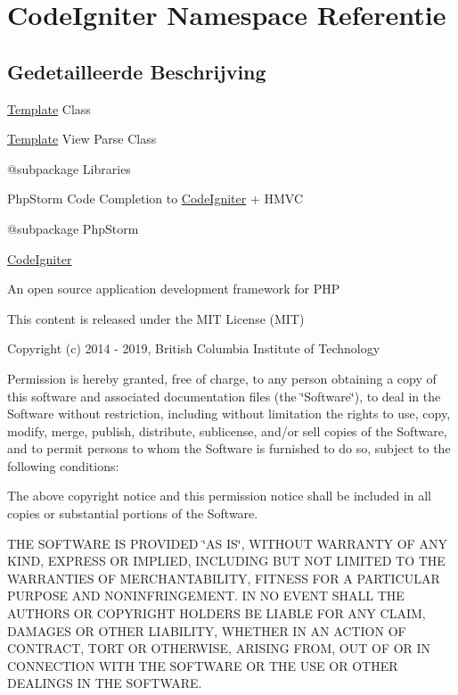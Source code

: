 \hypertarget{namespace_code_igniter}{}\section{Code\+Igniter Namespace Referentie}
\label{namespace_code_igniter}


\subsection{Gedetailleerde Beschrijving}
\mbox{\hyperlink{class_template}{Template}} Class

\mbox{\hyperlink{class_template}{Template}} View Parse Class

@subpackage Libraries

Php\+Storm Code Completion to \mbox{\hyperlink{namespace_code_igniter}{Code\+Igniter}} + H\+M\+VC

@subpackage Php\+Storm

\mbox{\hyperlink{namespace_code_igniter}{Code\+Igniter}}

An open source application development framework for P\+HP

This content is released under the M\+IT License (M\+IT)

Copyright (c) 2014 -\/ 2019, British Columbia Institute of Technology

Permission is hereby granted, free of charge, to any person obtaining a copy of this software and associated documentation files (the \char`\"{}\+Software\char`\"{}), to deal in the Software without restriction, including without limitation the rights to use, copy, modify, merge, publish, distribute, sublicense, and/or sell copies of the Software, and to permit persons to whom the Software is furnished to do so, subject to the following conditions\+:

The above copyright notice and this permission notice shall be included in all copies or substantial portions of the Software.

T\+HE S\+O\+F\+T\+W\+A\+RE IS P\+R\+O\+V\+I\+D\+ED \char`\"{}\+A\+S I\+S\char`\"{}, W\+I\+T\+H\+O\+UT W\+A\+R\+R\+A\+N\+TY OF A\+NY K\+I\+ND, E\+X\+P\+R\+E\+SS OR I\+M\+P\+L\+I\+ED, I\+N\+C\+L\+U\+D\+I\+NG B\+UT N\+OT L\+I\+M\+I\+T\+ED TO T\+HE W\+A\+R\+R\+A\+N\+T\+I\+ES OF M\+E\+R\+C\+H\+A\+N\+T\+A\+B\+I\+L\+I\+TY, F\+I\+T\+N\+E\+SS F\+OR A P\+A\+R\+T\+I\+C\+U\+L\+AR P\+U\+R\+P\+O\+SE A\+ND N\+O\+N\+I\+N\+F\+R\+I\+N\+G\+E\+M\+E\+NT. IN NO E\+V\+E\+NT S\+H\+A\+LL T\+HE A\+U\+T\+H\+O\+RS OR C\+O\+P\+Y\+R\+I\+G\+HT H\+O\+L\+D\+E\+RS BE L\+I\+A\+B\+LE F\+OR A\+NY C\+L\+A\+IM, D\+A\+M\+A\+G\+ES OR O\+T\+H\+ER L\+I\+A\+B\+I\+L\+I\+TY, W\+H\+E\+T\+H\+ER IN AN A\+C\+T\+I\+ON OF C\+O\+N\+T\+R\+A\+CT, T\+O\+RT OR O\+T\+H\+E\+R\+W\+I\+SE, A\+R\+I\+S\+I\+NG F\+R\+OM, O\+UT OF OR IN C\+O\+N\+N\+E\+C\+T\+I\+ON W\+I\+TH T\+HE S\+O\+F\+T\+W\+A\+RE OR T\+HE U\+SE OR O\+T\+H\+ER D\+E\+A\+L\+I\+N\+GS IN T\+HE S\+O\+F\+T\+W\+A\+RE.

